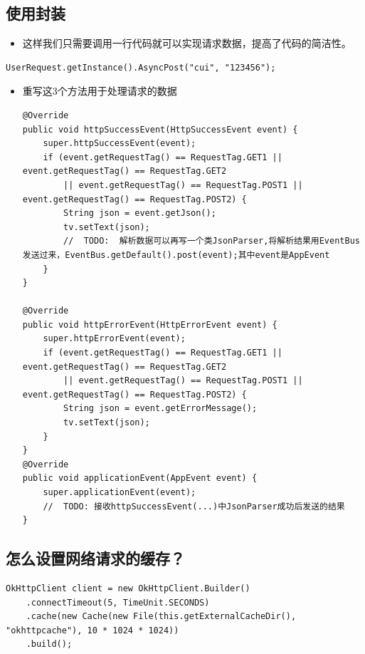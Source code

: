 \documentclass[9pt, b5paper]{article}
\begin{document}
\subsection{使用封装}
\label{sec-4-10}
\begin{itemize}
\item 这样我们只需要调用一行代码就可以实现请求数据，提高了代码的简洁性。
\end{itemize}
\begin{verbatim}
UserRequest.getInstance().AsyncPost("cui", "123456");
\end{verbatim}
\begin{itemize}
\item 重写这3个方法用于处理请求的数据
\begin{verbatim}
@Override
public void httpSuccessEvent(HttpSuccessEvent event) {
    super.httpSuccessEvent(event);
    if (event.getRequestTag() == RequestTag.GET1 || event.getRequestTag() == RequestTag.GET2
        || event.getRequestTag() == RequestTag.POST1 || event.getRequestTag() == RequestTag.POST2) {
        String json = event.getJson();
        tv.setText(json);
        //  TODO:  解析数据可以再写一个类JsonParser,将解析结果用EventBus发送过来，EventBus.getDefault().post(event);其中event是AppEvent
    }
}

@Override
public void httpErrorEvent(HttpErrorEvent event) {
    super.httpErrorEvent(event);
    if (event.getRequestTag() == RequestTag.GET1 || event.getRequestTag() == RequestTag.GET2
        || event.getRequestTag() == RequestTag.POST1 || event.getRequestTag() == RequestTag.POST2) {
        String json = event.getErrorMessage();
        tv.setText(json);
    }
}
@Override
public void applicationEvent(AppEvent event) {
    super.applicationEvent(event);
    //  TODO: 接收httpSuccessEvent(...)中JsonParser成功后发送的结果
}
\end{verbatim}
\end{itemize}
\subsection{怎么设置网络请求的缓存？}
\label{sec-4-11}
\begin{verbatim}
OkHttpClient client = new OkHttpClient.Builder()  
    .connectTimeout(5, TimeUnit.SECONDS)  
    .cache(new Cache(new File(this.getExternalCacheDir(), "okhttpcache"), 10 * 1024 * 1024))  
    .build();
\end{verbatim}
\end{document}
